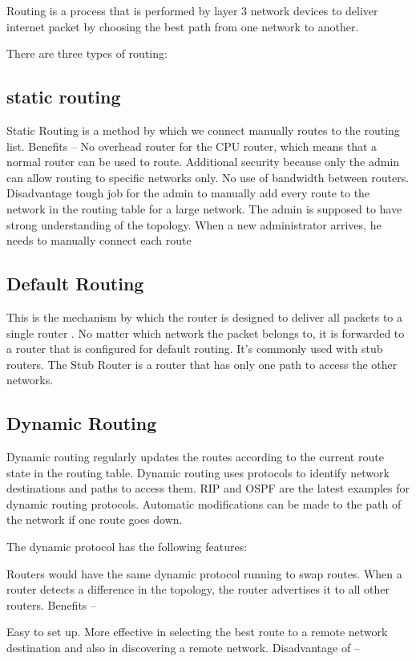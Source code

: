 \documentclass[12pt]{article}
\begin{document}
Routing is a process that is performed by layer 3 network devices to deliver internet packet by choosing the best path from one network to another. 

There are three types of routing: 
\subsection{static routing}
Static Routing is a method by which we connect manually  routes to the routing list. 
Benefits – 
No overhead router for the CPU router, which means that a normal router can be used to route. 
Additional security because only the admin can allow routing to specific networks only. 
No use of bandwidth between routers. 
Disadvantage  
tough job for the admin to manually add every route to the network in the routing table for a large network. 
The admin is supposed to have strong understanding of the topology. When a new administrator arrives, he needs to manually connect each route


\subsection{Default Routing}

This is the mechanism by which the router is designed to deliver all packets to a single router .  No matter which network the packet belongs to, it is forwarded to a router that is configured for default routing. It's commonly used with stub routers. The Stub Router is a router that has only one path to access the other networks.
\subsection{Dynamic Routing}
Dynamic routing regularly updates the routes according to the current route state in the routing table. Dynamic routing uses protocols to identify network destinations and paths to access them. RIP and OSPF are the latest examples for dynamic routing protocols. Automatic modifications can be made to the path of the network if one route goes down.

The dynamic protocol has the following features: 

Routers would have the same dynamic protocol running to swap routes. 
When a router detects a difference in the topology, the router advertises it to all other routers.
Benefits – 

Easy to set up. 
More effective in selecting the best route to a remote network destination and also in discovering a remote network. 
Disadvantage of – 
\end{document}
